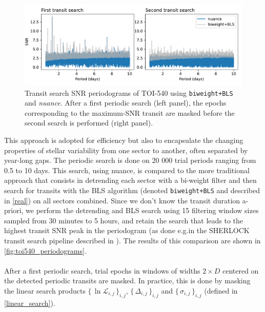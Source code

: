 \documentclass[modern]{aastex631}
\newcommand{\nuancemethod}{\textit{nuance}}
\newcommand{\nuance}{\nuancemethod{}}
\newcommand{\nuancecode}{\textsf{nuance}}
\newcommand{\set}[1]{\{\,#1\,\}}
\begin{document}
\begin{figure}[H]
    \begin{centering}
        \includegraphics[width=\linewidth]{../workflows/comparison_toi/figures/TOI 540/periodograms.pdf} 
        \caption{Transit search SNR periodograms of TOI-540 using \texttt{biweight+BLS} and \nuance{}. After a first periodic search (left panel), the epochs corresponding to the maximum-SNR transit are masked before the second search is performed (right panel).}
        \label{fig:toi540_periodograms}
    \end{centering}
\end{figure}
This approach is adopted for efficiency but also to encapsulate the changing properties of stellar variability from one sector to another, often separated by year-long gaps. The periodic search is done on 20 000 trial periods ranging from 0.5 to 10 days. This search, using \nuancecode{}, is compared to the more traditional approach that consists in detrending each sector with a bi-weight filter and then search for transits with the BLS algorithm (denoted \texttt{biweight+BLS} and described in \autoref{real}) on all sectors combined. Since we don't know the transit duration a-priori, we perform the detrending and BLS search using 15 filtering window sizes sampled from 30 minutes to 5 hours, and retain the search that leads to the highest transit SNR peak in the periodogram (as done e.g.\;in the SHERLOCK transit search pipeline described in \citealt{Pozuelos2020}). The results of this comparison are shown in \autoref{fig:toi540_periodograms}.\\\\
After a first periodic search, trial epochs in windows of widths $2\times D$ centered on the detected periodic transits are masked. In practice, this is done by masking the linear search products $\set{\ln\mathcal{L}_{i,j}}_{i, j}$, $\set{\Delta_{i,j}}_{i, j}$ and $\set{\sigma_{i,j}}_{i, j}$ (defined in \autoref{linear_search}).\\\\
\end{document}
